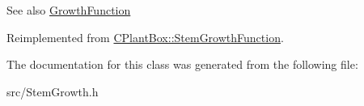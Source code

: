 \begin{DoxySeeAlso}{See also}
\hyperlink{classCPlantBox_1_1GrowthFunction}{Growth\+Function} 
\end{DoxySeeAlso}


Reimplemented from \hyperlink{classCPlantBox_1_1StemGrowthFunction_a108fded2964de8ab07f97b43c65cf78a}{C\+Plant\+Box\+::\+Stem\+Growth\+Function}.



The documentation for this class was generated from the following file\+:\begin{DoxyCompactItemize}
\item 
src/Stem\+Growth.\+h\end{DoxyCompactItemize}
